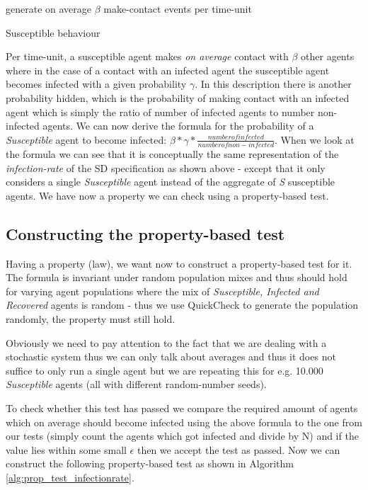 \begin{algorithm}
generate on average $\beta$ make-contact events per time-unit\; 
\caption{Susceptible behaviour}
\end{algorithm}

Per time-unit, a susceptible agent makes \textit{on average} contact with $\beta$ other agents where in the case of a contact with an infected agent the susceptible agent becomes infected with a given probability $\gamma$. In this description there is another probability hidden, which is the probability of making contact with an infected agent which is simply the ratio of number of infected agents to number non-infected agents. We can now derive the formula for the probability of a \textit{Susceptible} agent to become infected: $\beta * \gamma * \frac{number of infected}{number of non-infected}$. When we look at the formula we can see that it is conceptually the same representation of the \textit{infection-rate} of the SD specification as shown above - except that it only considers a single \textit{Susceptible} agent instead of the aggregate of \textit{S} susceptible agents. We have now a property we can check using a property-based test.

\subsection{Constructing the property-based test}
Having a property (law), we want now to construct a property-based test for it. The formula is invariant under random population mixes and thus should hold for varying agent populations where the mix of \textit{Susceptible, Infected and Recovered} agents is random - thus we use QuickCheck to generate the population randomly, the property must still hold.

Obviously we need to pay attention to the fact that we are dealing with a stochastic system thus we can only talk about averages and thus it does not suffice to only run a single agent but we are repeating this for e.g. 10.000 \textit{Susceptible} agents (all with different random-number seeds). 

To check whether this test has passed we compare the required amount of agents which on average should become infected using the above formula to the one from our tests (simply count the agents which got infected and divide by N) and if the value lies within some small $\epsilon$ then we accept the test as passed. Now we can construct the following property-based test as shown in Algorithm \ref{alg:prop_test_infectionrate}.

